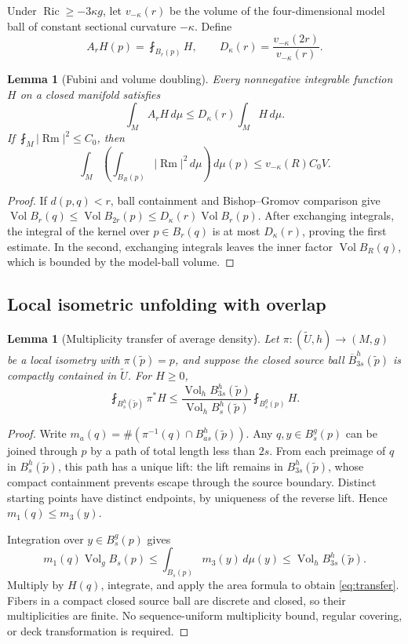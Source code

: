 \documentclass[a4paper,11pt]{article}
\theoremstyle{paper}
\newtheorem{lemma}[theorem]{Lemma}
\DeclareMathOperator{\Ric}{Ric}
\DeclareMathOperator{\Rm}{Rm}
\DeclareMathOperator{\Vol}{Vol}
\newcommand{\dd}{\,d\mu}
\newcommand{\av}{\fint}
\numberwithin{equation}{section}
\begin{document}
Under $\Ric\ge-3\kappa g$, let $v_{-\kappa}(r)$ be the volume of the four-dimensional model ball of constant sectional curvature $-\kappa$. Define
\[
A_rH(p)=\av_{B_r(p)}H,\qquad
D_\kappa(r)=\frac{v_{-\kappa}(2r)}{v_{-\kappa}(r)}.
\]
\begin{lemma}[Fubini and volume doubling]\label{lem:fubini}
Every nonnegative integrable function $H$ on a closed manifold satisfies
\begin{equation}\label{eq:average-fubini}
\int_M A_rH\dd\le D_\kappa(r)\int_MH\dd.
\end{equation}
If $\av_M|\Rm|^2\le C_0$, then
\begin{equation}\label{eq:absolute-fubini}
\int_M\left(\int_{B_R(p)}|\Rm|^2\dd\right)\dd(p)
\le v_{-\kappa}(R)C_0V.
\end{equation}
\end{lemma}
\begin{proof}
If $d(p,q)<r$, ball containment and Bishop--Gromov comparison give
$\Vol B_r(q)\le\Vol B_{2r}(p)\le D_\kappa(r)\Vol B_r(p)$.
After exchanging integrals, the integral of the kernel over $p\in B_r(q)$ is at most $D_\kappa(r)$, proving the first estimate. In the second, exchanging integrals leaves the inner factor $\Vol B_R(q)$, which is bounded by the model-ball volume.
\end{proof}

\subsection{Local isometric unfolding with overlap}

\begin{lemma}[Multiplicity transfer of average density]\label{lem:transfer}
Let $\pi:(\widetilde U,h)\to(M,g)$ be a local isometry with $\pi(\tilde p)=p$, and suppose the closed source ball $\overline B^h_{3s}(\tilde p)$ is compactly contained in $\widetilde U$. For $H\ge0$,
\begin{equation}\label{eq:transfer}
\av_{B_s^h(\tilde p)}\pi^*H
\le\frac{\Vol_h B_{3s}^h(\tilde p)}{\Vol_h B_s^h(\tilde p)}\av_{B_s^g(p)}H.
\end{equation}
\end{lemma}
\begin{proof}
Write $m_a(q)=\#(\pi^{-1}(q)\cap B_{as}^h(\tilde p))$. Any $q,y\in B_s^g(p)$ can be joined through $p$ by a path of total length less than $2s$. From each preimage of $q$ in $B_s^h(\tilde p)$, this path has a unique lift: the lift remains in $B_{3s}^h(\tilde p)$, whose compact containment prevents escape through the source boundary. Distinct starting points have distinct endpoints, by uniqueness of the reverse lift. Hence $m_1(q)\le m_3(y)$.

Integration over $y\in B_s^g(p)$ gives
\[
m_1(q)\Vol_gB_s(p)\le\int_{B_s(p)}m_3(y)\dd(y)
\le\Vol_hB_{3s}^h(\tilde p).
\]
Multiply by $H(q)$, integrate, and apply the area formula to obtain \eqref{eq:transfer}. Fibers in a compact closed source ball are discrete and closed, so their multiplicities are finite. No sequence-uniform multiplicity bound, regular covering, or deck transformation is required.
\end{proof}
\end{document}
